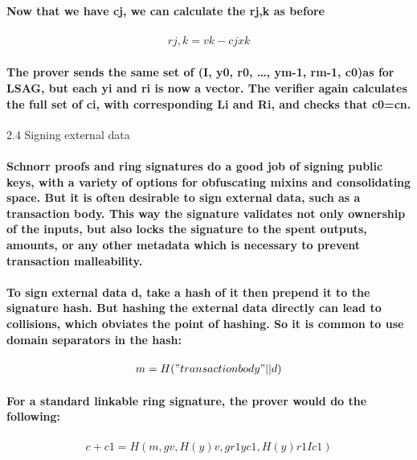 \documentclass{article}
\begin{document}
\paragraph{Now that we have cj, we can calculate the rj,k as before}

\begin{eqnarray}
  rj,k=vk-cjxk
\end{eqnarray}

\paragraph{The prover sends the same set of (I, y0, r0, …, ym-1, rm-1, c0)as for LSAG, but each yi and ri is now a vector.  The verifier again calculates the full set of ci, with corresponding Li and Ri, and checks that c0=cn.}


2.4 Signing external data

\paragraph{Schnorr proofs and ring signatures do a good job of signing public keys, with a variety of options for obfuscating mixins and consolidating space.  But it is often desirable to sign external data, such as a transaction body.  This way the signature validates not only ownership of the inputs, but also locks the signature to the spent outputs, amounts, or any other metadata which is necessary to prevent transaction malleability.}

\paragraph{To sign external data d, take a hash of it then prepend it to the signature hash.  But hashing the external data directly can lead to collisions, which obviates the point of hashing.  So it is common to use domain separators in the hash:}

\begin{eqnarray}
  m = H("transaction body" || d)
\end{eqnarray}

\paragraph{For a standard linkable ring signature, the prover would do the following:}

\begin{eqnarray}
  c+c1=H(m, gv, H(y)v, gr1yc1, H(y)r1Ic1)
\end{eqnarray}
\end{document}

